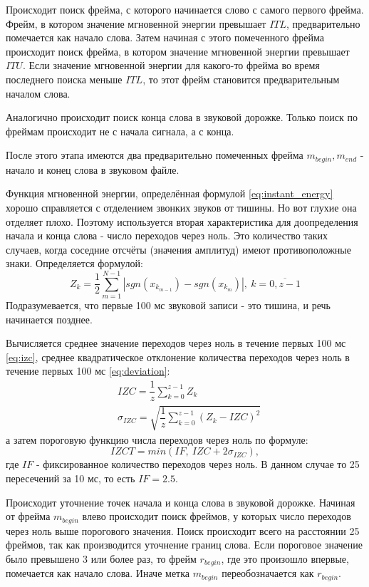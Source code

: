 Происходит поиск фрейма, с которого начинается слово с самого первого фрейма. Фрейм, в котором значение мгновенной энергии превышает $ITL$, предварительно помечается как начало слова. Затем начиная с этого помеченного фрейма происходит поиск фрейма, в котором значение мгновенной энергии превышает $ITU$. Если значение мгновенной энергии для какого-то фрейма во время последнего поиска меньше $ITL$, то этот фрейм становится предварительным началом слова. 

Аналогично происходит поиск конца слова в звуковой дорожке. Только поиск по фреймам происходит не с начала сигнала, а с конца.

После этого этапа имеются два предварительно помеченных фрейма $m_{begin}, m_{end}$  - начало и конец слова в звуковом файле.

Функция мгновенной энергии, определённая формулой \eqref{eq:instant_energy} хорошо справляется с отделением звонких звуков от тишины. Но вот глухие она отделяет плохо. Поэтому используется вторая характеристика для доопределения начала и конца слова - число переходов через ноль. Это количество таких случаев, когда соседние отсчёты (значения амплитуд) имеют противоположные знаки. Определяется формулой:
\begin{equation}
	Z_k = \dfrac{1}{2} \sum_{m=1}^{N-1} |sgn(x_{k_{m-1}}) - sgn(x_{k_m})|,~k=\overline{0,z-1}
\end{equation}
Подразумевается, что первые 100 мс звуковой записи - это тишина, и речь начинается позднее.

Вычисляется среднее значение переходов через ноль в течение первых 100 мс \eqref{eq:izc},  среднее квадратическое отклонение количества переходов через ноль в течение первых 100 мс \eqref{eq:deviation}:
\begin{align}
	\label{eq:izc}
	&IZC = \dfrac{1}{z} \sum_{k=0}^{z-1} Z_k \\
	\label{eq:deviation}
	&\sigma_{IZC} = \sqrt{\dfrac{1}{z} \sum_{k=0}^{z-1} (Z_k - IZC)^2}
\end{align}
а затем пороговую функцию числа переходов через ноль по формуле:
\begin{equation}
	IZCT = min(IF,~IZC + 2 \sigma_{IZC}),
\end{equation}
где $IF$ - фиксированное количество переходов через ноль. В данном случае 
то 25 пересечений за 10 мс, то есть $IF=2.5$. 

Происходит уточнение точек начала и конца слова в звуковой дорожке. Начиная от фрейма $m_{begin}$ влево происходит поиск фреймов, у которых число переходов через ноль выше порогового значения. Поиск происходит всего на расстоянии 25 фреймов, так как производится уточнение границ слова. Если пороговое значение было превышено 3 или более раз, то фрейм $r_{begin}$, где это произошло впервые, помечается как начало слова. Иначе метка $m_{begin}$ переобозначается как $r_{begin}$.

